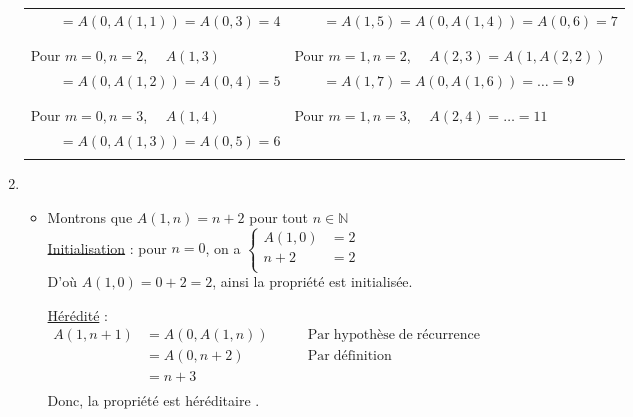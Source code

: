 \begin{enumerate}
\begin{tabular}{l|l}
$  \qquad = A\left(0,A(1,1)\right) = A(0,3) = 4$ &
                             $\qquad   = A(1,5) = A\left(0,A(1,4)\right) = A(0,6) = 7$ \\
 & \\                             
 \hline
 & \\
 Pour $m=0, n=2 $, $ \quad A(1,3)$  &
                             Pour $m=1, n=2$, $ \quad  A(2,3) = A\left(1,A(2,2)\right)  $ \\
$  \qquad = A\left(0,A(1,2)\right) = A(0,4) = 5$ &
                             $\qquad   = A(1,7) = A\left(0,A(1,6)\right) = \ldots = 9$ \\
 & \\                             
 \hline
 & \\
 Pour $m=0, n=3 $, $ \quad A(1,4)$  &
                             Pour $m=1, n=3$, $ \quad  A(2,4)= \ldots = 11$ \\
$  \qquad = A\left(0,A(1,3)\right) = A(0,5) = 6$ & \\
 & \\                             
 \hline                                                
\end{tabular}


\bigskip 


\item ~
\begin{itemize}
\item Montrons que $A(1,n) = n+2 $ pour tout $n \in \mathbb{N}$ \\

\underline{Initialisation} : pour $n=0$, on a  $ \left\lbrace 
                                                                       \begin{array}{rl}
                                                                       A(1,0) & = 2 \\
                                                                       n+2    & =2  \\
                                                                       \end{array}
                                                                    \right. $ \\
 D'où $A(1,0) = 0 + 2 = 2$, ainsi la propriété est initialisée.
 
 \bigskip 
 
 \underline{Hérédité} :  \\
 $  \begin{array}{rll}
                                         A (1, n+1) & = A\left(0, A(1,n)\right)  & \qquad \mathrm{Par\; hypothèse\; de\; récurrence} \\
                                                          & = A (0, n+2)  & \qquad \mathrm{Par\;définition} \\
                                                          & = n + 3 \\
                                        \end{array} $ \\
Donc, la propriété est héréditaire . \\


\end{itemize}
\end{enumerate}
